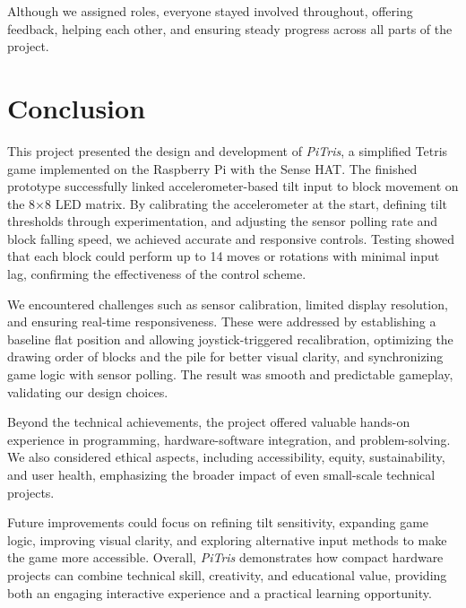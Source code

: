 \documentclass[12pt]{report}
\begin{document}
 \vspace{3ex}Although we assigned roles, everyone stayed involved throughout, offering feedback, helping each other, and ensuring steady progress across all parts of the project. 

\chapter{Conclusion}

This project presented the design and development of \textit{PiTris}, a simplified Tetris game implemented on the Raspberry Pi with the Sense HAT. The finished prototype successfully linked accelerometer-based tilt input to block movement on the 8×8 LED matrix. By calibrating the accelerometer at the start, defining tilt thresholds through experimentation, and adjusting the sensor polling rate and block falling speed, we achieved accurate and responsive controls. Testing showed that each block could perform up to 14 moves or rotations with minimal input lag, confirming the effectiveness of the control scheme.

We encountered challenges such as sensor calibration, limited display resolution, and ensuring real-time responsiveness. These were addressed by establishing a baseline flat position and allowing joystick-triggered recalibration, optimizing the drawing order of blocks and the pile for better visual clarity, and synchronizing game logic with sensor polling. The result was smooth and predictable gameplay, validating our design choices.

Beyond the technical achievements, the project offered valuable hands-on experience in programming, hardware-software integration, and problem-solving. We also considered ethical aspects, including accessibility, equity, sustainability, and user health, emphasizing the broader impact of even small-scale technical projects.

Future improvements could focus on refining tilt sensitivity, expanding game logic, improving visual clarity, and exploring alternative input methods to make the game more accessible. Overall, \textit{PiTris} demonstrates how compact hardware projects can combine technical skill, creativity, and educational value, providing both an engaging interactive experience and a practical learning opportunity.








\end{document}
